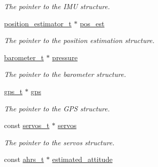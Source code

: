 \begin{DoxyCompactItemize}
\begin{DoxyCompactList}\small\item\em The pointer to the I\+M\+U structure. \end{DoxyCompactList}\item 
\hypertarget{structsimulation__model__t_a81df1f3cf23755d83bb3f31c06c2befc}{\hyperlink{structposition__estimator__t}{position\+\_\+estimator\+\_\+t} $\ast$ \hyperlink{structsimulation__model__t_a81df1f3cf23755d83bb3f31c06c2befc}{pos\+\_\+est}}\label{structsimulation__model__t_a81df1f3cf23755d83bb3f31c06c2befc}

\begin{DoxyCompactList}\small\item\em The pointer to the position estimation structure. \end{DoxyCompactList}\item 
\hypertarget{structsimulation__model__t_a3dcb1df328c45f0fcfa0939bbddaa78c}{\hyperlink{structbarometer__t}{barometer\+\_\+t} $\ast$ \hyperlink{structsimulation__model__t_a3dcb1df328c45f0fcfa0939bbddaa78c}{pressure}}\label{structsimulation__model__t_a3dcb1df328c45f0fcfa0939bbddaa78c}

\begin{DoxyCompactList}\small\item\em The pointer to the barometer structure. \end{DoxyCompactList}\item 
\hypertarget{structsimulation__model__t_adef23af80b1d87f2682ff4c0aac5445a}{\hyperlink{structgps__t}{gps\+\_\+t} $\ast$ \hyperlink{structsimulation__model__t_adef23af80b1d87f2682ff4c0aac5445a}{gps}}\label{structsimulation__model__t_adef23af80b1d87f2682ff4c0aac5445a}

\begin{DoxyCompactList}\small\item\em The pointer to the G\+P\+S structure. \end{DoxyCompactList}\item 
\hypertarget{structsimulation__model__t_ae5304172e888e933b6e8224718623c81}{const \hyperlink{structservos__t}{servos\+\_\+t} $\ast$ \hyperlink{structsimulation__model__t_ae5304172e888e933b6e8224718623c81}{servos}}\label{structsimulation__model__t_ae5304172e888e933b6e8224718623c81}

\begin{DoxyCompactList}\small\item\em The pointer to the servos structure. \end{DoxyCompactList}\item 
\hypertarget{structsimulation__model__t_aa3372634e0ef7009df8d327ecc64a3e6}{const \hyperlink{structahrs__t}{ahrs\+\_\+t} $\ast$ \hyperlink{structsimulation__model__t_aa3372634e0ef7009df8d327ecc64a3e6}{estimated\+\_\+attitude}}\label{structsimulation__model__t_aa3372634e0ef7009df8d327ecc64a3e6}


\end{DoxyCompactItemize}
